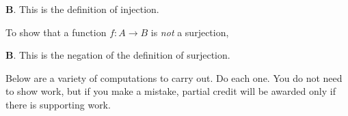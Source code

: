 \documentclass[addpoints]{exam}
\begin{document}
\begin{questions}
	
	\begin{solution}
		\textbf{B}. This is the definition of injection. 
	\end{solution}
	
\question[2] To show that a function $f: A \to B$  is \emph{not} a surjection,

\begin{solution}
	\textbf{B}. This is the negation of the definition of surjection. 
\end{solution}




\question Below are a variety of computations to carry out. Do each one. You do not need to show work, but if you make a mistake, partial credit will be awarded only if there is supporting work. 
	\begin{parts}

\end{parts}
\end{questions}
\end{document}
